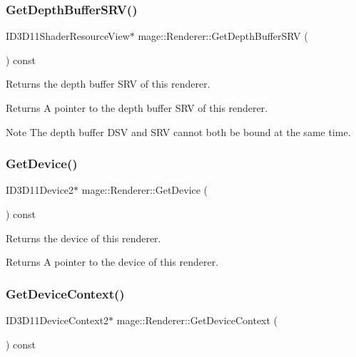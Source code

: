 \subsubsection{\texorpdfstring{Get\+Depth\+Buffer\+S\+R\+V()}{GetDepthBufferSRV()}}
{\footnotesize\ttfamily I\+D3\+D11\+Shader\+Resource\+View$\ast$ mage\+::\+Renderer\+::\+Get\+Depth\+Buffer\+S\+RV (\begin{DoxyParamCaption}{ }\end{DoxyParamCaption}) const\hspace{0.3cm}{\ttfamily [noexcept]}}

Returns the depth buffer S\+RV of this renderer.

\begin{DoxyReturn}{Returns}
A pointer to the depth buffer S\+RV of this renderer. 
\end{DoxyReturn}
\begin{DoxyNote}{Note}
The depth buffer D\+SV and S\+RV cannot both be bound at the same time. 
\end{DoxyNote}
\hypertarget{classmage_1_1_renderer_a9510b8784447ed0fa9b43e7a4bf1fc80}{}\label{classmage_1_1_renderer_a9510b8784447ed0fa9b43e7a4bf1fc80} 
\subsubsection{\texorpdfstring{Get\+Device()}{GetDevice()}}
{\footnotesize\ttfamily I\+D3\+D11\+Device2$\ast$ mage\+::\+Renderer\+::\+Get\+Device (\begin{DoxyParamCaption}{ }\end{DoxyParamCaption}) const\hspace{0.3cm}{\ttfamily [noexcept]}}

Returns the device of this renderer.

\begin{DoxyReturn}{Returns}
A pointer to the device of this renderer. 
\end{DoxyReturn}
\hypertarget{classmage_1_1_renderer_a13df5f31b3d18d2f4428743ebd7ffbe5}{}\label{classmage_1_1_renderer_a13df5f31b3d18d2f4428743ebd7ffbe5} 
\subsubsection{\texorpdfstring{Get\+Device\+Context()}{GetDeviceContext()}}
{\footnotesize\ttfamily I\+D3\+D11\+Device\+Context2$\ast$ mage\+::\+Renderer\+::\+Get\+Device\+Context (\begin{DoxyParamCaption}{ }\end{DoxyParamCaption}) const\hspace{0.3cm}{\ttfamily [noexcept]}}

